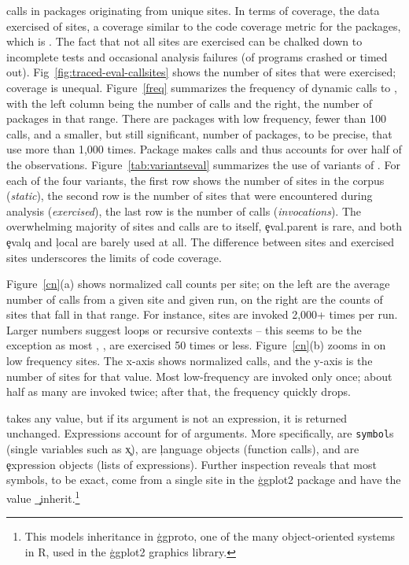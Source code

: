 \documentclass[screen,acmsmall]{acmart}
\begin{document}
\packageAllcalls calls in \packageTriggeredpkgs packages originating from
\PkgHitEvalCallSites unique sites. In terms of coverage, the data exercised
\PkgHitEvalCallSitesAvgRatio of sites, a coverage similar to the code coverage
metric for the packages, which is \PkgCodeCoverage. The fact that not all sites
are exercised can be chalked down to incomplete tests and occasional analysis
failures (\PkgFailedProgramsRatio of programs crashed or timed out).
Fig~\ref{fig:traced-eval-callsites} shows the number of sites that were
exercised; coverage is unequal. Figure~\ref{freq} summarizes the frequency of
dynamic calls to \eval, with the left
column being the number of calls and the right, the number of packages in that
range. There are \packageFewcalls packages with low \eval frequency, fewer than
100 calls, and a smaller, but still significant, number of packages,
\packageManycalls to be precise, that use \eval more than 1,000 times. Package
\packageMaxcallspack makes \packageMaxcalls calls and thus accounts for over
half of the observations. Figure~\ref{tab:variantseval} summarizes the use of
variants of \eval. For each of the four variants, the first row shows the number
of sites in the corpus (\emph{static}), the second row is the number of sites
that were encountered during analysis (\emph{exercised}), the last row is the
number of calls (\emph{invocations}). The overwhelming majority of sites and
calls are to \eval itself, \c{eval.parent} is rare, and both \c{evalq} and
\c{local} are barely used at all. The difference between sites and exercised
sites underscores the limits of code coverage.


Figure~\ref{cn}(a) shows normalized call counts per site; on the left are the
average number of calls from a given site and given run, on the right are the
counts of sites that fall in that range. For instance, \packageRunbinh sites are
invoked 2,000+ times per run. Larger numbers suggest loops or recursive contexts
-- this seems to be the exception as most \evals, \packageRunbina, are exercised
50 times or less. Figure~\ref{cn}(b) zooms in on low frequency sites. The x-axis
shows normalized calls, and the y-axis is the number of sites for that value.
Most low-frequency \evals are invoked only once; about half as many are invoked
twice; after that, the frequency quickly drops.

\Eval takes any value, but if its argument is not an expression, it is returned
unchanged. Expressions account for \packageCodepercent of arguments. More
specifically, \packageSymbolpercent are \texttt{symbol}s (single variables such
as \c{x}), \packageLanguagepercent are \c{language} objects (function calls),
  and \packageExpressionpercent are \c{expression} objects (lists of
  expressions). Further inspection reveals that most symbols,
  \packageGgplotsymbolpercent to be exact, come from a single site in the
  \c{ggplot2} package and have the value \c{\_inherit}.\footnote{This models
  inheritance in \c{ggproto}, one of the many object-oriented systems in R, used
  in the \c{ggplot2} graphics library.}
\end{document}
